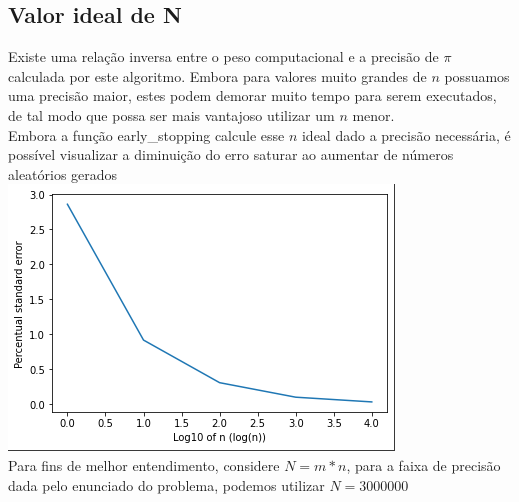 \documentclass[twocolumn,amsmath,amssymb,floatfix]{revtex4}
\begin{document}
\subsection{Valor ideal de N}
Existe uma relação inversa entre o peso computacional e a precisão de $\pi$ calculada por este algoritmo. Embora para valores muito grandes de $n$ possuamos uma precisão maior, estes podem demorar muito tempo para serem executados, de tal modo que possa ser mais vantajoso utilizar um $n$ menor.
\\\indent Embora a função early\_stopping calcule esse $n$ ideal dado a precisão necessária, é possível visualizar a diminuição do erro saturar ao aumentar de números aleatórios gerados
\\\includegraphics[scale=0.85]{prct_std_error.png}
\\\indent Para fins de melhor entendimento, considere $N = m*n$, para a faixa de precisão dada pelo enunciado do problema, podemos utilizar $N = 3000000$
\end{document}
